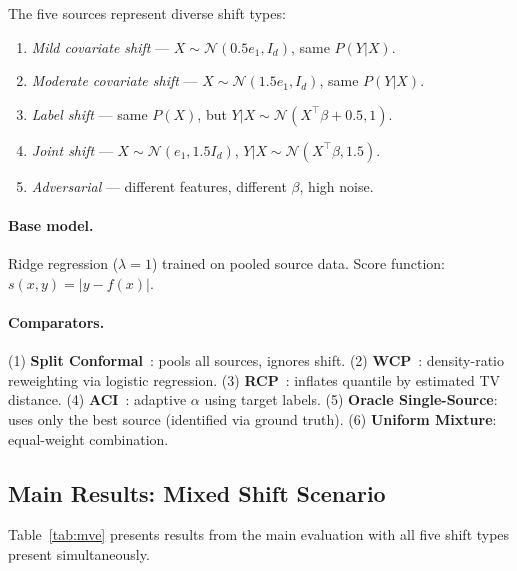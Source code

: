 \documentclass{article}
\begin{document}
The five sources represent diverse shift types:
\begin{enumerate}
\item[\textbf{S1}:] \emph{Mild covariate shift} --- $X \sim \mathcal{N}(0.5 e_1, I_d)$, same $P(Y|X)$.
\item[\textbf{S2}:] \emph{Moderate covariate shift} --- $X \sim \mathcal{N}(1.5 e_1, I_d)$, same $P(Y|X)$.
\item[\textbf{S3}:] \emph{Label shift} --- same $P(X)$, but $Y | X \sim \mathcal{N}(X^\top\beta + 0.5, 1)$.
\item[\textbf{S4}:] \emph{Joint shift} --- $X \sim \mathcal{N}(e_1, 1.5 I_d)$, $Y | X \sim \mathcal{N}(X^\top\beta, 1.5)$.
\item[\textbf{S5}:] \emph{Adversarial} --- different features, different $\beta$, high noise.
\end{enumerate}

\paragraph{Base model.}
Ridge regression ($\lambda = 1$) trained on pooled source data. Score function: $s(x, y) = |y - f(x)|$.

\paragraph{Comparators.}
(1) \textbf{Split Conformal}~\citep{vovk2005algorithmic}: pools all sources, ignores shift. (2) \textbf{WCP}~\citep{tibshirani2019conformal}: density-ratio reweighting via logistic regression. (3) \textbf{RCP}~\citep{cauchois2024robust}: inflates quantile by estimated TV distance. (4) \textbf{ACI}~\citep{gibbs2021adaptive}: adaptive $\alpha$ using target labels. (5) \textbf{Oracle Single-Source}: uses only the best source (identified via ground truth). (6) \textbf{Uniform Mixture}: equal-weight combination.

\subsection{Main Results: Mixed Shift Scenario}
\label{sec:main_results}

Table~\ref{tab:mve} presents results from the main evaluation with all five shift types present simultaneously.
\end{document}
